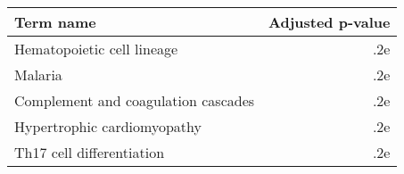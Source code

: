 \begin{tabular}{lr}
\toprule
                          Term name &  Adjusted p-value \\
\midrule
         Hematopoietic cell lineage &               .2e \\
                            Malaria &               .2e \\
Complement and coagulation cascades &               .2e \\
        Hypertrophic cardiomyopathy &               .2e \\
          Th17 cell differentiation &               .2e \\
\bottomrule
\end{tabular}
